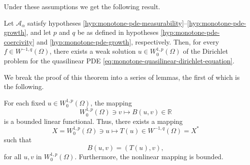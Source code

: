 Under these assumptions we get the following result.

\begin{Theorem}
\label{thm:monotone-quasilinear-dirichlet-existence}
Let $\mathcal{A}_\alpha$ satisfy hypotheses \ref{hyp:monotone-pde-measurability}--\ref{hyp:monotone-pde-growth}, and let $p$ and $q$ be as defined in hypotheses \ref{hyp:monotone-pde-coercivity} and \ref{hyp:monotone-pde-growth}, respectively. Then, for every $f\in W^{-1,q}(\Omega)$, there exists a weak solution $u\in W_0^{1,p}(\Omega)$ of the Dirichlet problem for the quasilinear PDE \eqref{eq:monotone-quasilinear-dirichlet-equation}.
\end{Theorem}

We break the proof of this theorem into a series of lemmas, the first of which is the following.

\begin{Lemma}
\label{lem:monotone-pde-induced-bounded-dual-mapping}
For each fixed $u\in W_0^{1,p}(\Omega)$, the mapping
\begin{equation}\label{eq:monotone-pde-bounded-test-functional}
W_0^{1,p}(\Omega)\ni v\mapsto B(u,v)\in\mathbb{R}
\end{equation}
is a bounded linear functional. Thus, there exists a mapping
\begin{equation}\label{eq:monotone-pde-induced-dual-mapping}
X=W_0^{1,p}(\Omega)\ni u\mapsto T(u)\in W^{-1,q}(\Omega)=X^*
\end{equation}
such that
\begin{equation}\label{eq:monotone-pde-induced-duality-pairing}
B(u,v)=(T(u),v),
\end{equation}
for all $u,v$ in $W_0^{1,p}(\Omega)$. Furthermore, the nonlinear mapping is bounded.
\end{Lemma}

